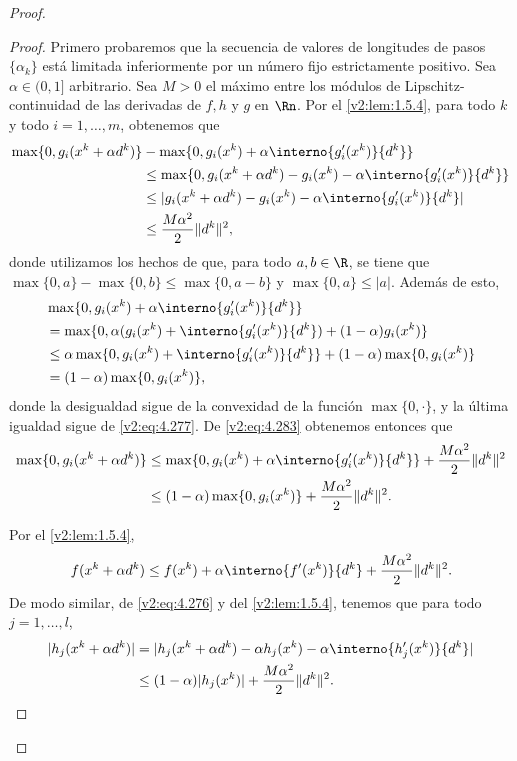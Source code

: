 \begin{proof}
\begin{proof}
Primero probaremos que la secuencia de valores de longitudes de pasos $\{\alpha_k\}$ está limitada inferiormente por un número fijo estrictamente positivo. Sea $\alpha \in (0, 1]$ arbitrario. Sea $M > 0$ el máximo entre los módulos de Lipschitz-continuidad de las derivadas de $f, h$ y $g$ en $\Rn$. Por el \cref{v2:lem:1.5.4}, para todo $k$ y todo $i = 1, \dots, m$, obtenemos que
\begin{align}
\max\{0, g_i(x^k + \alpha d^k)\} &- \max\{0, g_i(x^k) + \alpha \interno{g'_i(x^k)}{d^k}\} \nonumber \\
&\le \max\{0, g_i(x^k + \alpha d^k) - g_i(x^k) - \alpha \interno{g'_i(x^k)}{d^k}\} \nonumber \\
&\le |g_i(x^k + \alpha d^k) - g_i(x^k) - \alpha \interno{g'_i(x^k)}{d^k}| \nonumber \\
&\le \frac{M\alpha^2}{2} \|d^k\|^2, \label{v2:eq:4.283}
\end{align}
donde utilizamos los hechos de que, para todo $a, b \in \R$, se tiene que $\max\{0, a\} - \max\{0, b\} \le \max\{0, a - b\}$ y $\max\{0, a\} \le |a|$.
Además de esto,
\begin{align*}
&\max\{0, g_i(x^k) + \alpha \interno{g'_i(x^k)}{d^k}\} \\
&= \max\{0, \alpha (g_i(x^k) + \interno{g'_i(x^k)}{d^k}) + (1 - \alpha) g_i(x^k)\} \\
&\le \alpha \max\{0, g_i(x^k) + \interno{g'_i(x^k)}{d^k}\} + (1 - \alpha) \max\{0, g_i(x^k)\} \\
&= (1 - \alpha) \max\{0, g_i(x^k)\},
\end{align*}
donde la desigualdad sigue de la convexidad de la función $\max\{0, \cdot\}$, y la última igualdad sigue de \eqref{v2:eq:4.277}. De \eqref{v2:eq:4.283} obtenemos entonces que
\begin{align}
\max\{0, g_i(x^k + \alpha d^k)\} &\le \max\{0, g_i(x^k) + \alpha \interno{g'_i(x^k)}{d^k}\} + \frac{M\alpha^2}{2} \|d^k\|^2 \nonumber \\
&\le (1 - \alpha) \max\{0, g_i(x^k)\} + \frac{M\alpha^2}{2} \|d^k\|^2. \label{v2:eq:4.284}
\end{align}

Por el \cref{v2:lem:1.5.4},
\begin{equation}
f(x^k + \alpha d^k) \le f(x^k) + \alpha \interno{f'(x^k)}{d^k} + \frac{M\alpha^2}{2} \|d^k\|^2. \label{v2:eq:4.285}
\end{equation}
De modo similar, de \eqref{v2:eq:4.276} y del \cref{v2:lem:1.5.4}, tenemos que para todo $j = 1, \dots, l$,
\begin{align}
|h_j(x^k + \alpha d^k)| &= |h_j(x^k + \alpha d^k) - \alpha h_j(x^k) - \alpha \interno{h'_j(x^k)}{d^k}| \nonumber \\
&\le (1 - \alpha)|h_j(x^k)| + \frac{M\alpha^2}{2} \|d^k\|^2. \label{v2:eq:4.286}
\end{align}
\end{proof}


\end{proof}
